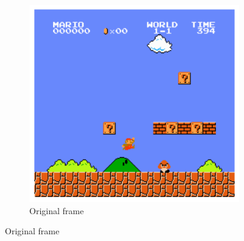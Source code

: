 \begin{figure}[ht]
    \begin{subfigure}{\textwidth}
        \centering
        \includegraphics*[width=.5\textwidth]{images/bw_comparison/original.png}
        \caption*{Original frame}
    \end{subfigure}


\end{figure}
